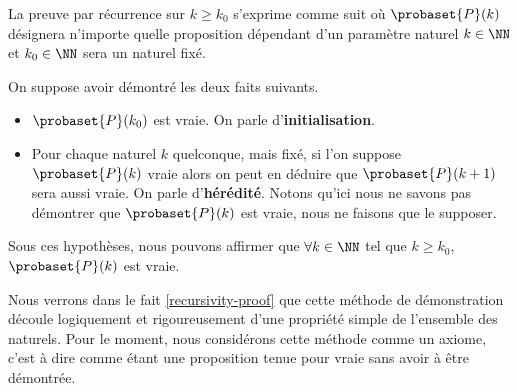 \begin{fact} \label{recursivity}
	La preuve par récurrence sur $k \geq k_0$ s'exprime comme suit où $\probaset{P}(k)$ désignera n'importe quelle proposition dépendant d'un paramètre naturel $k \in \NN$ et $k_0 \in \NN$ sera un naturel fixé.

	\medskip

	On suppose avoir démontré les deux faits suivants.
	
	\begin{itemize}[label=\small\textbullet]
		\item $\probaset{P}(k_0)$ est vraie. On parle d'\textbf{initialisation}.

		\item Pour chaque naturel $k$ quelconque, mais fixé, si l'on suppose $\probaset{P}(k)$ vraie alors on peut en déduire que $\probaset{P}(k+1)$ sera aussi vraie. On parle d'\textbf{hérédité}. Notons qu'ici nous ne savons pas démontrer que $\probaset{P}(k)$ est vraie, nous ne faisons que le supposer.
	\end{itemize}

	Sous ces hypothèses, nous pouvons affirmer que $\forall k \in \NN$ tel que $k \geq k_0$, $\probaset{P}(k)$ est vraie.
\end{fact}


\begin{remark}
	Nous verrons dans le fait \ref{recursivity-proof} que cette méthode de démonstration découle logiquement et rigoureusement d'une propriété simple de l'ensemble des naturels.
	Pour le moment, nous considérons cette méthode comme un axiome, c'est à dire comme étant une proposition tenue pour vraie sans avoir à être démontrée.  
\end{remark}
